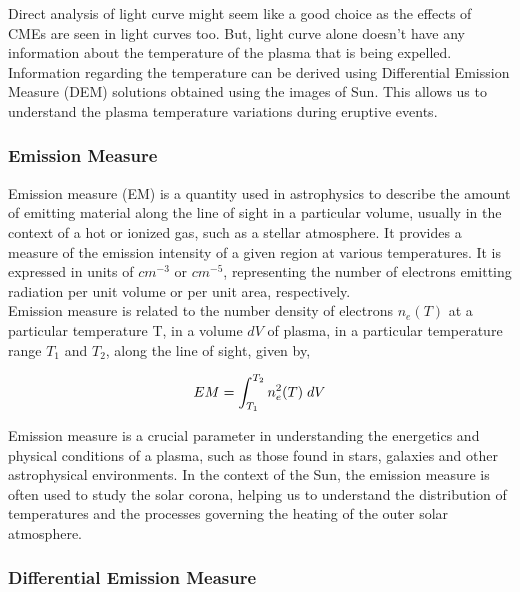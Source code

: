 Direct analysis of light curve might seem like a good choice as the effects of CMEs are seen in light curves too. But, light curve alone doesn't have any information about the temperature of the plasma that is being expelled. Information regarding the temperature can be derived using Differential Emission Measure (DEM) solutions obtained using the images of Sun. This allows us to understand the plasma temperature variations during eruptive events.

\subsubsection{Emission Measure}

Emission measure (EM) is a quantity used in astrophysics to describe the amount of emitting material along the line of sight in a particular volume, usually in the context of a hot or ionized gas, such as a stellar atmosphere. It provides a measure of the emission intensity of a given region at various temperatures. It is expressed in units of $cm^{-3}$ or $cm^{-5}$, representing the number of electrons  emitting radiation per unit volume or per unit area, respectively.\\

Emission measure is related to the number density of electrons $n_e(T)$  at a particular temperature T, in a volume $dV$ of plasma, in a particular temperature range $T_1$ and $T_2$, along the line of sight, given by,

\vspace{-0.75cm}
\begin{center}
    \begin{equation}
        EM = \int_{T_1}^{T_2} n_e^2(T) \hspace{0.1cm} dV
    \end{equation}
\end{center}

Emission measure is a crucial parameter in understanding the energetics and physical conditions of a plasma, such as those found in stars, galaxies and other astrophysical environments. In the context of the Sun, the emission measure is often used to study the solar corona, helping us to understand the distribution of temperatures and the processes governing the heating of the outer solar atmosphere.

\subsubsection{Differential Emission Measure}

